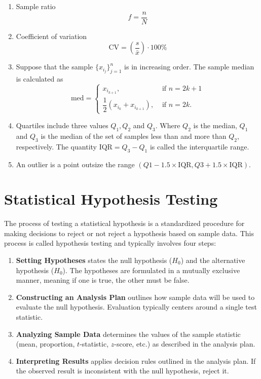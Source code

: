 \begin{enumerate}
 \item Sample ratio
       \begin{equation}
        f = \dfrac{n}{N}
       \end{equation}
 \item Coefficient of variation
       \begin{equation}
        \mathrm{CV} = \left(\frac{s}{\bar{x}}\right) \cdot 100\%
       \end{equation}
 \item Suppose that the sample $\{x_{i_j}\}_{j=1}^n$ is in increasing order. The sample median is calculated as
       \begin{equation}
        \mathrm{med} = \begin{cases}
         x_{i_{k+1}},                            & \text{ if } n = 2k+1 \\
         \dfrac{1}{2} (x_{i_{k}} + x_{i_{k+1}}), & \text{ if } n = 2k.
        \end{cases}
       \end{equation}
 \item Quartiles include three values $Q_1,Q_2$ and $Q_3$. Where $Q_2$ is the median, $Q_1$ and $Q_3$ is the median of the set of samples less than and more than $Q_2$, respectively. The quantity $\mathrm{IQR} = Q_3-Q_1$ is called the interquartile range.
 \item An outlier is a point outsize the range $(Q1 - 1.5 \times \mathrm{IQR}, Q3 + 1.5 \times \mathrm{IQR})$.
\end{enumerate}

\section{Statistical Hypothesis Testing}
The process of testing a statistical hypothesis is a standardized procedure for making decisions to reject or not reject a hypothesis based on sample data. This process is called hypothesis testing and typically involves four steps:

\begin{enumerate}
 \item \textbf{Setting Hypotheses} states the null hypothesis ($H_0$) and the  alternative hypothesis ($H_0$). The hypotheses are formulated in a mutually exclusive manner, meaning if one is true, the other must be false.
 \item \textbf{Constructing an Analysis Plan} outlines how sample data will be used to evaluate the null hypothesis. Evaluation typically centers around a single test statistic.
 \item \textbf{Analyzing Sample Data} determines the values of the sample statistic (mean, proportion, $t$-statistic, $z$-score, etc.) as described in the analysis plan.
 \item \textbf{Interpreting Results} applies decision rules outlined in the analysis plan. If the observed result is inconsistent with the null hypothesis, reject it.
\end{enumerate}

